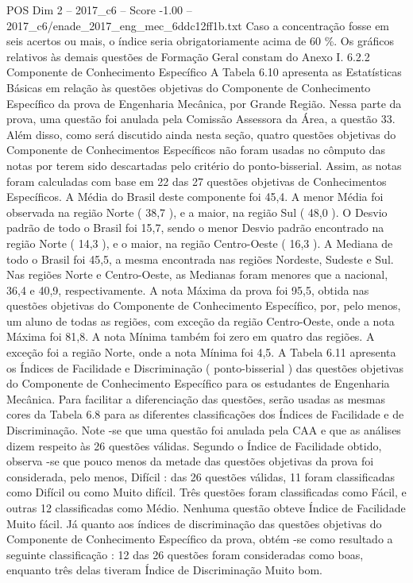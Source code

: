 \begin{textsample}{POS Dim 2 – 2017\_c6 – Score -1.00 – 2017\_c6/enade\_2017\_eng\_mec\_6ddc12ff1b.txt}
Caso a concentração fosse em seis acertos ou mais, o índice seria obrigatoriamente acima de 60 \%.
Os gráficos relativos às demais questões de Formação Geral constam do Anexo I. 6.2.2 Componente de Conhecimento Específico A Tabela 6.10 apresenta as Estatísticas Básicas em relação às questões objetivas do Componente de Conhecimento Específico da prova de Engenharia Mecânica, por Grande Região.
Nessa parte da prova, uma questão foi anulada pela Comissão Assessora da Área, a questão 33.
Além disso, como será discutido ainda nesta seção, quatro questões objetivas do Componente de Conhecimentos Específicos não foram usadas no cômputo das notas por terem sido descartadas pelo critério do ponto-bisserial.
Assim, as notas foram calculadas com base em 22 das 27 questões objetivas de Conhecimentos Específicos.
A Média do Brasil deste componente foi 45,4.
A menor Média foi observada na região Norte ( 38,7 ), e a maior, na região Sul ( 48,0 ).
O Desvio padrão de todo o Brasil foi 15,7, sendo o menor Desvio padrão encontrado na região Norte ( 14,3 ), e o maior, na região Centro-Oeste ( 16,3 ).
A Mediana de todo o Brasil foi 45,5, a mesma encontrada nas regiões Nordeste, Sudeste e Sul.
Nas regiões Norte e Centro-Oeste, as Medianas foram menores que a nacional, 36,4 e 40,9, respectivamente.
A nota Máxima da prova foi 95,5, obtida nas questões objetivas do Componente de Conhecimento Específico, por, pelo menos, um aluno de todas as regiões, com exceção da região Centro-Oeste, onde a nota Máxima foi 81,8.
A nota Mínima também foi zero em quatro das regiões.
A exceção foi a região Norte, onde a nota Mínima foi 4,5.
A Tabela 6.11 apresenta os Índices de Facilidade e Discriminação ( ponto-bisserial ) das questões objetivas do Componente de Conhecimento Específico para os estudantes de Engenharia Mecânica.
Para facilitar a diferenciação das questões, serão usadas as mesmas cores da Tabela 6.8 para as diferentes classificações dos Índices de Facilidade e de Discriminação.
Note -se que uma questão foi anulada pela CAA e que as análises dizem respeito às 26 questões válidas.
Segundo o Índice de Facilidade obtido, observa -se que pouco menos da metade das questões objetivas da prova foi considerada, pelo menos, Difícil : das 26 questões válidas, 11 foram classificadas como Difícil ou como Muito difícil.
Três questões foram classificadas como Fácil, e outras 12 classificadas como Médio.
Nenhuma questão obteve Índice de Facilidade Muito fácil.
Já quanto aos índices de discriminação das questões objetivas do Componente de Conhecimento Específico da prova, obtém -se como resultado a seguinte classificação : 12 das 26 questões foram consideradas como boas, enquanto três delas tiveram Índice de Discriminação Muito bom.

\end{textsample}
